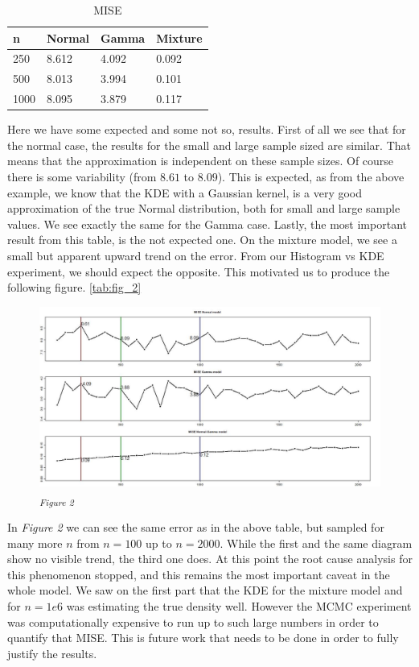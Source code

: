 \documentclass[fleqn, a4paper]{report}
\begin{document}
\begin{table}[]
\centering
\begin{tabular}{|l|lll|}
\hline
n & Normal & Gamma & Mixture \\ \hline
250 & 8.612 & 4.092 & 0.092 \\
500 & 8.013 & 3.994 & 0.101 \\
1000 & 8.095 & 3.879 & 0.117 \\ \hline
\end{tabular}
\caption{MISE}
\label{tab:table_1}
\end{table}

Here we have some expected and some not so, results. First of all we see that for the normal case, the results for the small and large sample sized are similar. That means that the approximation is independent on these sample sizes. Of course there is some variability (from $8.61$ to $8.09$). This is expected, as from the above example, we know that the KDE with a Gaussian kernel, is a very good approximation of the true Normal distribution, both for small and large sample values. We see exactly the same for the Gamma case. Lastly, the most important result from this table, is the not expected one. On the mixture model, we see a small but apparent upward trend on the error. From our Histogram vs KDE experiment, we should expect the opposite. This motivated us to produce the following figure. \autoref{tab:fig_2}

\begin{figure}[!h]
\includegraphics[width=1\textwidth]{./images/MISE error.jpg}
\textsubscript{\textit{Figure 2}}
\label{tab:fig_2}
\end{figure}

In \textit{Figure 2} we can see the same error as in the above table, but sampled for many more $n$ from $n=100$ up to $n=2000$. While the first and the same diagram show no visible trend, the third one does. At this point the root cause analysis for this phenomenon stopped, and  this remains the most important caveat in the whole model. We saw on the first part that the KDE for the mixture model and for $n=1e6$ was estimating the true density well. However the MCMC experiment was computationally expensive to run up to such large numbers in order to quantify that MISE. This is future work that needs to be done in order to fully justify the results. 
\end{document}
